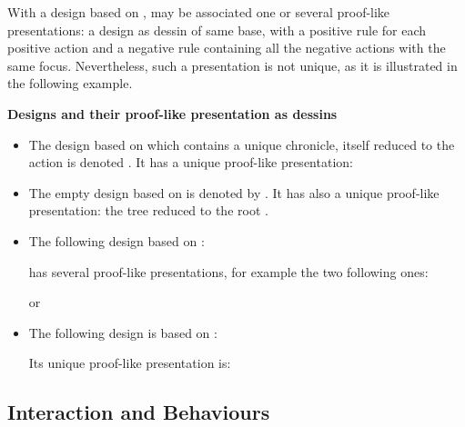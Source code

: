 \documentclass{LMCS}
\begin{document}
\noindent With a design based on , may be associated one or several proof-like presentations: a design as dessin of same base, with a positive rule for each positive action and a negative rule containing all the negative actions with the same focus. Nevertheless, such a presentation is not unique, as it is illustrated in the following example. 
\begin{exa} {\bf Designs and their proof-like presentation as dessins}\label{design-as-dessin}
\begin{itemize}
\item The design based on   which contains a unique chronicle, itself reduced to the action   is denoted . It has a unique proof-like presentation: 

\item The empty design based on   is denoted by . It has also a unique proof-like presentation: the tree reduced to the root  .
\item  The following design based on :
 
                        has several proof-like presentations, for example the two following ones:
\begin{center}
   \shortstack{
 \shortstack{  }
                     \hspace{1em}
  \shortstack{  } \\
                     \\
                     \\
                     \\
                     }      
                      or 
                     \shortstack{
     \shortstack{   }
                     \hspace{1em}
  \shortstack{  } \\
                     \\
                     \\
                     \\
                     }                             
\end{center}
 \item  	The following design is based on :
 
 Its unique proof-like presentation is:
	
\end{itemize}
\end{exa}
  

\subsection{Interaction and Behaviours}
\end{document}
